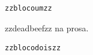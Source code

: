 \begin{verbatim}
zzblocoumzz
\end{verbatim}
zzdeadbeefzz na prosa.
\begin{verbatim}
zzblocodoiszz
\end{verbatim}
